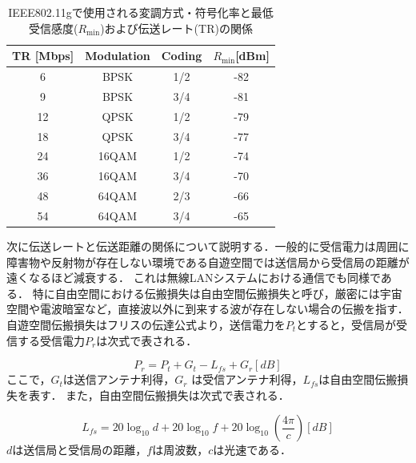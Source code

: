 \documentclass[a4paper,10.5pt]{ltjsarticle}
\begin{document}
\begingroup
\setmainfont{Times New Roman} 
\begin{table}[h]
  \caption{IEEE802.11gで使用される変調方式・符号化率と最低受信感度($R_{\text{min}}$)および伝送レート(TR)の関係}
  \centering
  \renewcommand{\arraystretch}{1.5}
  \begin{tabular}{c c c c}
    \toprule
    TR [Mbps] & Modulation & Coding & $R_{\text{min}}$[dBm] \\ 
    \midrule
    6  & BPSK  & 1/2  & -82 \\
    9  & BPSK  & 3/4  & -81 \\
    12 & QPSK  & 1/2  & -79 \\
    18 & QPSK  & 3/4  & -77 \\
    24 & 16QAM & 1/2  & -74 \\
    36 & 16QAM & 3/4  & -70 \\
    48 & 64QAM & 2/3  & -66 \\
    54 & 64QAM & 3/4  & -65 \\
    \bottomrule
  \end{tabular}
  \label{tab:IEEE802.11g_TR&Modulation} 
\end{table}
\endgroup
次に伝送レートと伝送距離の関係について説明する．一般的に受信電力は周囲に障害物や反射物が存在しない環境である自遊空間では送信局から受信局の距離が遠くなるほど減衰する．
これは無線LANシステムにおける通信でも同様である．
特に自由空間における伝搬損失は自由空間伝搬損失と呼び，厳密には宇宙空間や電波暗室など，直接波以外に到来する波が存在しない場合の伝搬を指す．
自遊空間伝搬損失はフリスの伝達公式より，送信電力を$P_t$とすると，受信局が受信する受信電力$P_r$は次式で表される．

\begin{equation}
  P_r = P_t + G_t - L_{fs} + G_r [dB]
  \label{eq:friis}
\end{equation}
\noindent
ここで，$G_t$は送信アンテナ利得，$G_r$ は受信アンテナ利得，$L_{fs}$は自由空間伝搬損失を表す．
また，自由空間伝搬損失は次式で表される．

\begin{equation}
  L_{fs} = 20\log_{10}d + 20\log_{10}f + 20\log_{10}(\frac{4\pi}{c})[dB]
  \label{eq:lfsp}
\end{equation}
\noindent   
$d$は送信局と受信局の距離，$f$は周波数，$c$は光速である．
\end{document}
